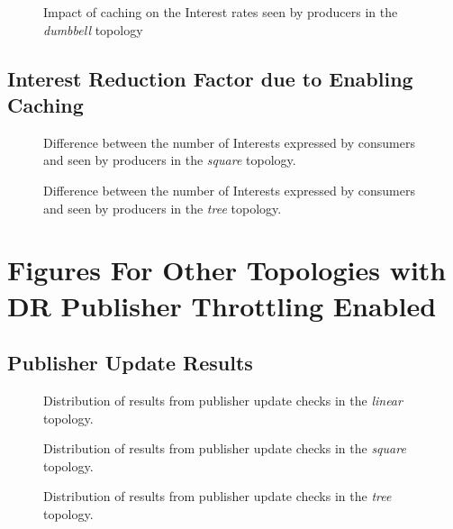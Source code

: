 \begin{appendices}
\begin{figure}[H]
    \centering
    \caption{Impact of caching on the Interest rates seen by producers in the \textit{dumbbell} topology}
\end{figure}

\section{Interest Reduction Factor due to Enabling Caching}
\begin{figure}[H]
    \centering
    \caption{Difference between the number of Interests expressed by consumers and seen by producers in the \textit{square} topology. }
\end{figure}
\begin{figure}[H]
    \centering
    \caption{Difference between the number of Interests expressed by consumers and seen by producers in the \textit{tree} topology. }
\end{figure}

\chapter{Figures For Other Topologies with DR Publisher Throttling Enabled}\label{app:eval:pub-throt}
\section{Publisher Update Results}

\begin{figure}[H]
    \centering
    \caption{Distribution of results from publisher update checks in the \textit{linear} topology.}
\end{figure}

\begin{figure}[H]
    \centering
    \caption{Distribution of results from publisher update checks in the \textit{square} topology.}
\end{figure}

\begin{figure}[H]
    \centering
    \caption{Distribution of results from publisher update checks in the \textit{tree} topology.}
\end{figure}



\end{appendices}
